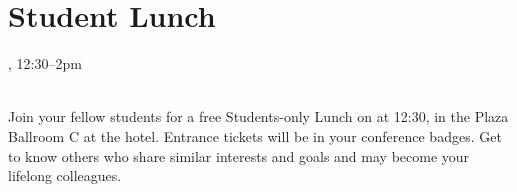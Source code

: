 \clearpage
\section{Student Lunch}
\setheaders{}{\daydateyear}

\begin{center}



\daydateyear, 12:30--2pm \vspace{1em}\\
\StudentLunchLoc \\
\end{center}

Join your fellow students for a free Students-only Lunch on \daydate
at 12:30, in the Plaza Ballroom C at the hotel.  Entrance tickets will
be in your conference badges.  Get to know others who share similar
interests and goals and may become your lifelong colleagues.
